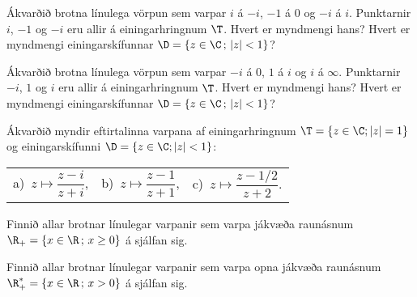 \daemi  Ákvarðið brotna línulega vörpun  sem varpar $i$ á $-i$,
$-1$ á $0$ og $-i$ á $i$.  Punktarnir $i$, $-1$ og $-i$ eru allir á
einingarhringnum $\T$.  Hvert er myndmengi hans?  Hvert er myndmengi 
einingarskífunnar $\D=\{z\in \C\,;\, |z|<1\}$?


\daemi  Ákvarðið brotna línulega vörpun  sem varpar $-i$ á $0$,
$1$ á $i$ og $i$ á $\infty$.  Punktarnir $-i$, $1$ og $i$ eru allir á
einingarhringnum $\T$.  Hvert er myndmengi hans?  Hvert er myndmengi 
einingarskífunnar $\D=\{z\in \C\,;\, |z|<1\}$?

\daemi Ákvarðið myndir eftirtalinna varpana af einingarhringnum $\T=\{z\in \C; 
|z|=1\}$ og einingarskífunni $\D=\{z\in \C;  |z|<1\}$:

\smallskip
\begin{tabular}{lll}
a)\ $z\mapsto \dfrac{z-i}{z+i}$,  &
b)\ $z\mapsto \dfrac{z-1}{z+1}$,  &
c)\ $z\mapsto \dfrac{z-1/2}{z+2}$.
\end{tabular}

\daemi Finnið allar brotnar línulegar varpanir sem varpa jákvæða
raunásnum $\R_+=\{x\in \R\,;\, x\geq 0\}$ á sjálfan sig.

\daemi Finnið allar brotnar línulegar varpanir sem varpa opna jákvæða 
raunásnum $\R_+^*=\{x\in \R\,;\, x>0\}$ á sjálfan sig.


